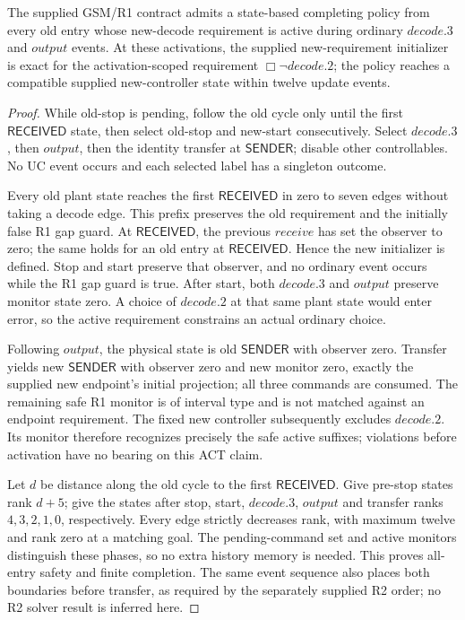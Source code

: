 \begin{proposition}\label{prop:gsm-active-policy}
The supplied GSM/R1 contract admits a state-based completing policy from every old entry whose new-decode requirement is active during ordinary $decode.3$ and $output$ events. At these activations, the supplied new-requirement initializer is exact for the activation-scoped requirement $\Box\neg decode.2$; the policy reaches a compatible supplied new-controller state within twelve update events.
\end{proposition}
\begin{proof}
While old-stop is pending, follow the old cycle only until the first $\mathsf{RECEIVED}$ state, then select old-stop and new-start consecutively. Select $decode.3$, then $output$, then the identity transfer at $\mathsf{SENDER}$; disable other controllables. No UC event occurs and each selected label has a singleton outcome.

Every old plant state reaches the first $\mathsf{RECEIVED}$ in zero to seven edges without taking a decode edge. This prefix preserves the old requirement and the initially false R1 gap guard. At $\mathsf{RECEIVED}$, the previous $receive$ has set the observer to zero; the same holds for an old entry at $\mathsf{RECEIVED}$. Hence the new initializer is defined. Stop and start preserve that observer, and no ordinary event occurs while the R1 gap guard is true. After start, both $decode.3$ and $output$ preserve monitor state zero. A choice of $decode.2$ at that same plant state would enter error, so the active requirement constrains an actual ordinary choice.

Following $output$, the physical state is old $\mathsf{SENDER}$ with observer zero. Transfer yields new $\mathsf{SENDER}$ with observer zero and new monitor zero, exactly the supplied new endpoint's initial projection; all three commands are consumed. The remaining safe R1 monitor is of interval type and is not matched against an endpoint requirement. The fixed new controller subsequently excludes $decode.2$. Its monitor therefore recognizes precisely the safe active suffixes; violations before activation have no bearing on this ACT claim.

Let $d$ be distance along the old cycle to the first $\mathsf{RECEIVED}$. Give pre-stop states rank $d+5$; give the states after stop, start, $decode.3$, $output$ and transfer ranks $4,3,2,1,0$, respectively. Every edge strictly decreases rank, with maximum twelve and rank zero at a matching goal. The pending-command set and active monitors distinguish these phases, so no extra history memory is needed. This proves all-entry safety and finite completion. The same event sequence also places both boundaries before transfer, as required by the separately supplied R2 order; no R2 solver result is inferred here.
\end{proof}

